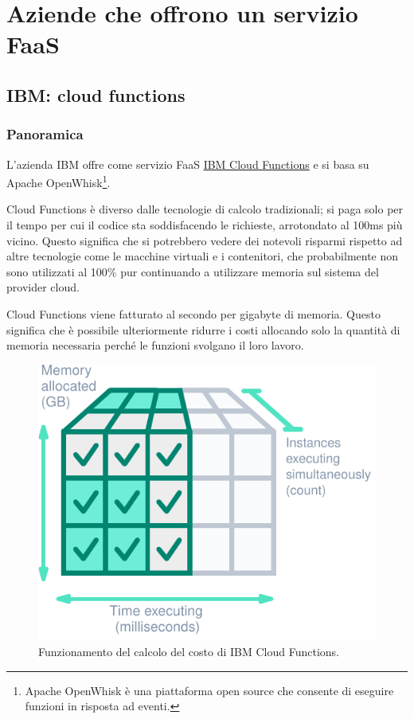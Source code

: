 \documentclass[a4paper]{article}
\begin{document}
	\section{Aziende che offrono un servizio FaaS}
	
	\subsection{IBM: cloud functions}
	
	\subsubsection{Panoramica}
	
	L'azienda IBM offre come servizio FaaS \href{https://cloud.ibm.com/functions/}{IBM Cloud Functions} e si basa su Apache OpenWhisk\footnote{Apache OpenWhisk è una piattaforma open source che consente di eseguire funzioni in risposta ad eventi.}. 	
	
	Cloud Functions è diverso dalle tecnologie di calcolo tradizionali; si paga solo per il tempo per cui il codice sta soddisfacendo le richieste, arrotondato al 100ms più vicino. Questo significa che si potrebbero vedere dei notevoli risparmi rispetto ad altre tecnologie come le macchine virtuali e i contenitori, che probabilmente non sono utilizzati al 100\% pur continuando a utilizzare memoria sul sistema del provider cloud.
	
	Cloud Functions viene fatturato al secondo per gigabyte di memoria. Questo significa che è possibile ulteriormente ridurre i costi allocando solo la quantità di memoria necessaria perché le funzioni svolgano il loro lavoro.
	\begin{figure}[!htp]
		\centering
		\includegraphics[width=.6\textwidth]{img/IBM-1.pdf}
		\caption{Funzionamento del calcolo del costo di IBM Cloud Functions.}
	\end{figure}
	
\end{document}
